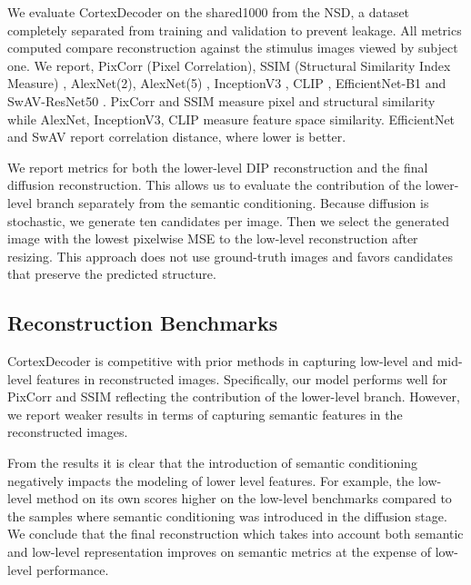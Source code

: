 We evaluate CortexDecoder on the shared1000 from the NSD, a dataset completely separated from training and validation to prevent leakage. All metrics computed compare reconstruction against the stimulus images viewed by subject one. We report, PixCorr (Pixel Correlation), SSIM (Structural Similarity Index Measure) \cite{1284395}, AlexNet(2), AlexNet(5) \cite{NIPS2012_c399862d}, InceptionV3 \cite{szegedy2015rethinkinginceptionarchitecturecomputer}, CLIP \cite{radford2021learningtransferablevisualmodels}, EfficientNet-B1 \cite{tan2020efficientnetrethinkingmodelscaling} and SwAV-ResNet50 \cite{caron2021unsupervisedlearningvisualfeatures}. PixCorr and SSIM measure pixel and structural similarity while AlexNet, InceptionV3, CLIP measure feature space similarity. EfficientNet and SwAV report correlation distance, where lower is better.

We report metrics for both the lower-level DIP reconstruction and the final diffusion reconstruction. This allows us to evaluate the contribution of the lower-level branch separately from the semantic conditioning. Because diffusion is stochastic, we generate ten candidates per image. Then we select the generated image with the lowest pixelwise MSE to the low-level reconstruction after resizing. This approach does not use ground-truth images and favors candidates that preserve the predicted structure.

\subsection{Reconstruction Benchmarks}
CortexDecoder is competitive with prior methods in capturing low-level and mid-level features in reconstructed images. Specifically, our model performs well for PixCorr and SSIM reflecting the contribution of the lower-level branch. However, we report weaker results in terms of capturing semantic features in the reconstructed images.

From the results it is clear that the introduction of semantic conditioning negatively impacts the modeling of lower level features. For example, the low-level method on its own scores higher on the low-level benchmarks compared to the samples where semantic conditioning was introduced in the diffusion stage. We conclude that the final reconstruction which takes into account both semantic and low-level representation improves on semantic metrics at the expense of low-level performance.


